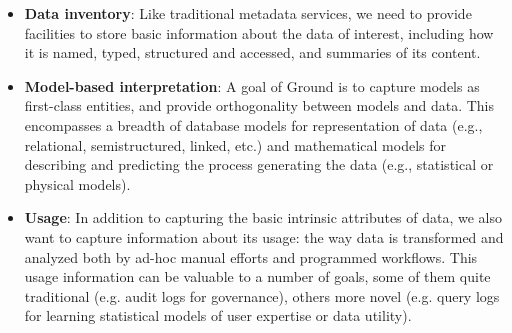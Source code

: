 \documentclass[10pt,letterpaper]{article}
\begin{document}
\begin{itemize}
\item {\bf Data inventory}: Like traditional metadata services, we need to provide facilities to store basic information about the data of interest, including how it is named, typed, structured and accessed, 
and summaries of its content.

\item {\bf Model-based interpretation}:  
A goal of Ground is to capture models as first-class entities, and provide orthogonality between models and data.  This encompasses a breadth of database models for representation of data (e.g., relational, semistructured, linked, etc.) and mathematical models for describing and predicting the process generating the data (e.g., statistical or physical models).

\item {\bf Usage}:
 In addition to capturing the basic intrinsic attributes of data, we also want to capture information about its usage: the way data is transformed and analyzed both by ad-hoc manual efforts and programmed workflows.  This usage information can be valuable to a number of goals, some of them quite traditional (e.g. audit logs for governance), others more novel (e.g. query logs for learning statistical models of user expertise or data utility).


\end{itemize}
\end{document}
